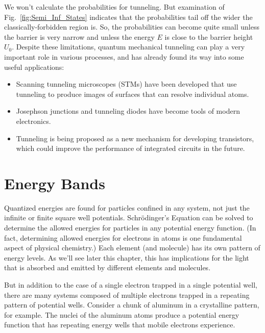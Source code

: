 We won't calculate the probabilities for tunneling. But examination of
Fig.~\ref{fig:Semi_Inf_States} indicates
that the probabilities tail off the wider the classically-forbidden region
is. So, the probabilities can become quite small unless the barrier is very
narrow and unless the energy $E$ is close to the barrier height $U_0$.
Despite these limitations, quantum mechanical tunneling can play a very
important role in various processes, and has already found its way into
some useful applications: 
\begin{itemize}
\item Scanning tunneling microscopes (STMs) have been developed that use
tunneling to produce images of surfaces that can resolve individual atoms.
\item Josephson junctions and tunneling diodes have become tools of modern
electronics. 
\item Tunneling is being proposed as a new mechanism for developing
transistors, which could improve the performance of integrated circuits
in the future.
\end{itemize}

\section{Energy Bands}
\label{sec:energy_bands}

Quantized energies are found for particles confined in any system, not
just the infinite or finite square well potentials. Schr\"{o}dinger's
Equation can be solved to determine the allowed energies for particles 
in any potential energy function. (In fact, determining allowed energies
for electrons in atoms is one fundamental aspect of physical 
chemistry.) Each element (and molecule) has its 
own pattern of energy levels. As we'll see later this chapter, this 
has implications for the light that is absorbed and emitted by different
elements and molecules.

But in addition to the case of a single electron trapped in a single 
potential well, there are many systems composed of multiple electrons
trapped in a repeating pattern of potential wells. Consider a chunk
of aluminum in a crystalline pattern, for example. The nuclei of
the aluminum atoms produce a potential energy function that has
repeating energy wells that mobile electrons experience.

